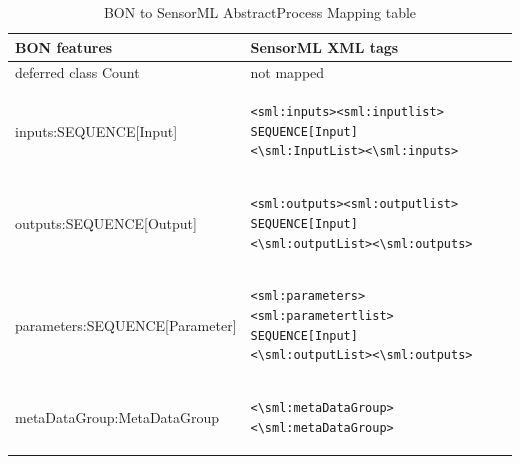 \documentclass[]{final_report}
\begin{document}
\begin{table}[!th]
\centering
\begin{tabular}{|l|l|}
\hline
BON features & SensorML XML tags\\
\hline
   deferred class Count  & not mapped\\
\hline     
     inputs:SEQUENCE[Input] & \begin{lstlisting}
<sml:inputs><sml:inputlist>
SEQUENCE[Input]
<\sml:InputList><\sml:inputs>\end{lstlisting}\\

\hline 
     outputs:SEQUENCE[Output] & \begin{lstlisting}
<sml:outputs><sml:outputlist>
SEQUENCE[Input]
<\sml:outputList><\sml:outputs>\end{lstlisting}\\
\hline
     parameters:SEQUENCE[Parameter] & \begin{lstlisting}
<sml:parameters><sml:parametertlist>
SEQUENCE[Input]
<\sml:outputList><\sml:outputs>\end{lstlisting}\\

\hline                 
     metaDataGroup:MetaDataGroup &  \begin{lstlisting}
<\sml:metaDataGroup><\sml:metaDataGroup>\end{lstlisting}\\
 \hline    

\end{tabular}
\caption{BON to SensorML AbstractProcess Mapping table}\label{table:bon_sml_example}
\label{ex:table}
\end{table}


\label{endpage}
\end{document}

